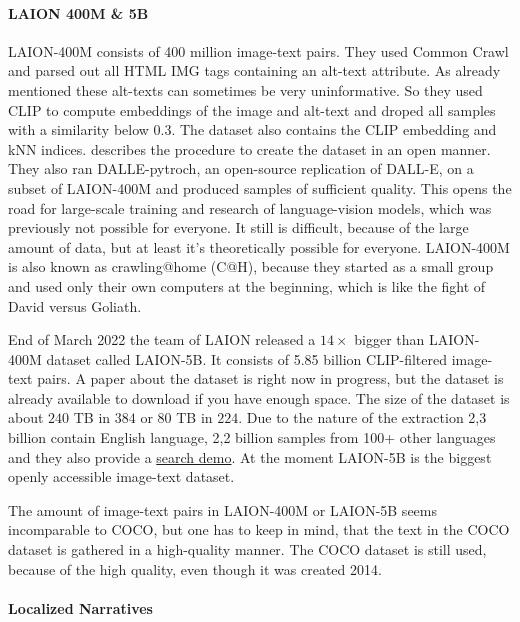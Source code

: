 \documentclass[
]{krantz}
\begin{document}
\hypertarget{laion-400m-5b}{%
\paragraph{LAION 400M \& 5B}\label{laion-400m-5b}}

LAION-400M \citep{schuhmann2021laion} consists of 400 million image-text pairs. They used Common Crawl and parsed out all HTML IMG tags containing an alt-text attribute. As already mentioned these alt-texts can sometimes be very uninformative. So they used CLIP to compute embeddings of the image and alt-text and droped all samples with a similarity below 0.3. The dataset also contains the CLIP embedding and kNN indices. \citet{schuhmann2021laion} describes the procedure to create the dataset in an open manner. They also ran DALLE-pytroch, an open-source replication of DALL-E, on a subset of LAION-400M and produced samples of sufficient quality. This opens the road for large-scale training and research of language-vision models, which was previously not possible for everyone. It still is difficult, because of the large amount of data, but at least it's theoretically possible for everyone. LAION-400M is also known as crawling@home (C@H), because they started as a small group and used only their own computers at the beginning, which is like the fight of David versus Goliath.

End of March 2022 the team of LAION released a \(14 \times\) bigger than LAION-400M dataset called LAION-5B. It consists of 5.85 billion CLIP-filtered image-text pairs. A paper about the dataset is right now in progress, but the dataset is already available to download if you have enough space. The size of the dataset is about \(240\) TB in \(384\) or 80 TB in \(224\). Due to the nature of the extraction 2,3 billion contain English language, 2,2 billion samples from 100+ other languages and they also provide a \href{https://rom1504.github.io/clip-retrieval/?back=https\%3A\%2F\%2Fknn5.laion.ai\&index=laion5B\&useMclip=false}{search demo}. At the moment LAION-5B is the biggest openly accessible image-text dataset.

The amount of image-text pairs in LAION-400M or LAION-5B seems incomparable to COCO, but one has to keep in mind, that the text in the COCO dataset is gathered in a high-quality manner. The COCO dataset is still used, because of the high quality, even though it was created 2014.

\hypertarget{localized-narratives}{%
\paragraph{Localized Narratives}\label{localized-narratives}}
\end{document}
